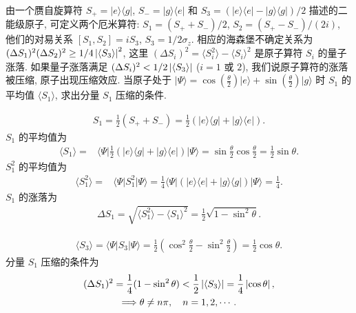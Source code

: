 \documentclass{assignment}
\begin{document}
\begin{prob}
    由一个赝自旋算符 $S_+=\lvert e\rangle\langle g\rvert$, $S_-=\lvert g\rangle\langle e\rvert$ 和 $S_3=(\lvert e\rangle\langle e\rvert-\lvert g\rangle\langle g\rvert)/2$ 描述的二能级原子, 可定义两个厄米算符: $S_1=(S_++S_-)/2$, $S_2=(S_+-S_-)/(2i)$, 他们的对易关系 $[S_1,S_2]=iS_3$, $S_3=1/2\sigma_z$. 相应的海森堡不确定关系为 $(\Delta S_1)^2(\Delta S_2)^2\geq 1/4\left\lvert\langle S_3\rangle\right\rvert^2$, 这里 $(\Delta S_i)^2=\langle S_i^2\rangle-\langle S_i\rangle^2$ 是原子算符 $S_i$ 的量子涨落. 如果量子涨落满足 $(\Delta S_i)^2<1/2\left\lvert\langle S_3\rangle\right\rvert$ ($i=1$ 或 $2$), 我们说原子算符的涨落被压缩, 原子出现压缩效应. 当原子处于 $\lvert\Psi\rangle=\cos(\frac{\theta}{2})\lvert e\rangle+\sin(\frac{\theta}{2})\lvert g\rangle$ 时 $S_1$ 的平均值 $\langle S_1\rangle$, 求出分量 $S_1$ 压缩的条件.
\end{prob}
\begin{sol}
    \begin{align}
        S_1=\frac{1}{2}(S_++S_-)=\frac{1}{2}(\lvert e\rangle\langle g\rvert+\lvert g\rangle\langle e\rvert).
    \end{align}
    $S_1$ 的平均值为
    \begin{align}
        \langle S_1\rangle=&\langle\Psi\rvert\frac{1}{2}(\lvert e\rangle\langle g\rvert+\lvert g\rangle\langle e\rvert)\lvert\Psi\rangle=\sin\frac{\theta}{2}\cos\frac{\theta}{2}=\frac{1}{2}\sin\theta.
    \end{align}
    $S_1^2$ 的平均值为
    \begin{align}
        \langle S_1^2\rangle=&\langle\Psi\rvert S_1^2\lvert\Psi\rangle=\frac{1}{4}\langle\Psi\rvert(\lvert e\rangle\langle e\rvert+\lvert g\rangle\langle g\rvert)\lvert\Psi\rangle=\frac{1}{4}.
    \end{align}
    $S_1$ 的涨落为
    \begin{align}
        \Delta S_1=\sqrt{\langle S_1^2\rangle-\langle S_1\rangle^2}=\frac{1}{2}\sqrt{1-\sin^2\theta}.
    \end{align}

    \begin{align}
        \langle S_3\rangle=\langle\Psi\rvert S_3\lvert\Psi\rangle=\frac{1}{2}\left(\cos^2\frac{\theta}{2}-\sin^2\frac{\theta}{2}\right)=\frac{1}{2}\cos\theta.
    \end{align}
    分量 $S_1$ 压缩的条件为
    \begin{gather}
        (\Delta S_1)^2=\frac{1}{4}(1-\sin^2\theta)<\frac{1}{2}\left\lvert\langle S_3\rangle\right\rvert=\frac{1}{4}\left\lvert\cos\theta\right\rvert,\\
        \Longrightarrow\theta\neq n\pi,\quad n=1,2,\cdots.
    \end{gather}
\end{sol}
\end{document}
